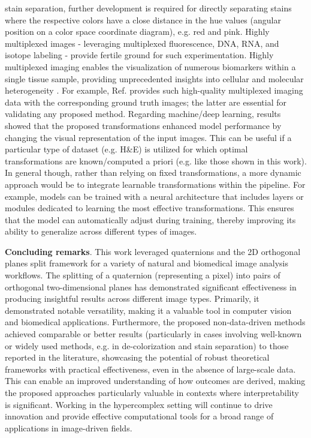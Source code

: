 \documentclass[superscriptaddress,longbibliography,aps,prl,twocolumn,10pt]{revtex4-2}
\begin{document}
stain separation, further development is required for directly separating stains where the respective colors have a close distance in the hue values (angular position on a color space coordinate diagram), e.g. red and pink. Highly multiplexed images - leveraging multiplexed fluorescence, DNA, RNA, and isotope labeling \cite{Lewis2021} - provide fertile ground for such experimentation. Highly multiplexed imaging enables the visualization of numerous biomarkers within a single tissue sample, providing unprecedented insights into cellular and molecular heterogeneity \cite{Valous2022}. For example, Ref. \cite{Radtke2022} provides such high-quality multiplexed imaging data with the corresponding ground truth images; the latter are essential for validating any proposed method. Regarding machine/deep learning, results showed that the proposed transformations enhanced model performance by changing the visual representation of the input images. This can be useful if a particular type of dataset (e.g. H\&E) is utilized for which optimal transformations are known/computed a priori (e.g. like those shown in this work). In general though, rather than relying on fixed transformations, a more dynamic approach would be to integrate learnable transformations within the pipeline. For example, models can be trained with a neural architecture that includes layers or modules dedicated to learning the most effective transformations. This ensures that the model can automatically adjust during training, thereby improving its ability to generalize across different types of images.
\parskip=5pt

\noindent
\textbf{Concluding remarks}. This work leveraged quaternions and the 2D orthogonal planes split framework for a variety of natural and biomedical image analysis workflows. The splitting of a quaternion (representing a pixel) into pairs of orthogonal two-dimensional planes has demonstrated significant effectiveness in producing insightful results across different image types. Primarily, it demonstrated notable versatility, making it a valuable tool in computer vision and biomedical applications. Furthermore, the proposed non-data-driven methods achieved comparable or better results (particularly in cases involving well-known or widely used methods, e.g. in de-colorization and stain separation) to those reported in the literature, showcasing the potential of robust theoretical frameworks with practical effectiveness, even in the absence of large-scale data. This can enable an improved understanding of how outcomes are derived, making the proposed approaches particularly valuable in contexts where interpretability is significant. Working in the hypercomplex setting will continue to drive innovation and provide effective computational tools for a broad range of applications in image-driven fields.
\end{document}
